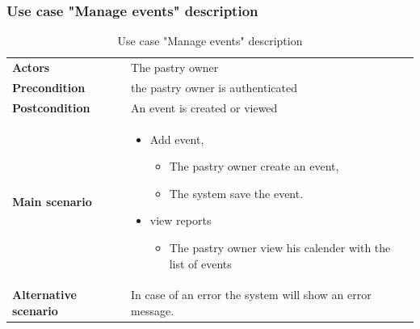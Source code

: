 \documentclass[12pt,a4paper]{report}
\begin{document}
	\subsubsection*{Use case "Manage events" description}
	\begin{table}[H]
		\begin{center}
			\captionsetup[table]{skip=10pt}
			\caption{Use case "Manage events" description}
			\setlength\doublerulesep{0.5pt}
			\begin{tabular}{|  p{5cm}|  p{9cm}|}
				\rowcolor{LightCyan}
				
				\hline
				\multicolumn{2}{c}{Use case "Manage events"}\\
				\hline
				
				\textbf{Actors} &                        
				The pastry owner
				\\ \hline
				
				\textbf{Precondition} &                        
				the pastry owner is authenticated
				\\ \hline
				\textbf{Postcondition} &                        
				An event is created or viewed
				\\ \hline
				
				\textbf{Main scenario} &                        
				\begin{itemize}
					\item Add event,
					\begin{itemize}
						\item The pastry owner create an event,
						\item The system save the event.
					\end{itemize}
					\item view reports
					
					\begin{itemize}
						\item The pastry owner view his calender with the list of events
					\end{itemize}
				\end{itemize}
				\\ \hline
				
				\textbf{Alternative scenario} &                        
				In case of an error the system will show an error message.
				\\ \hline
				
				
			\end{tabular}
			
		\end{center}
		
	\end{table}
\end{document}
